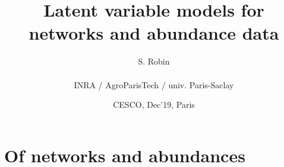 \documentclass[8pt]{beamer}
\begin{document}

\title{Latent variable models for networks and abundance data}

\author[S. Robin]{S. Robin \\ ~\\
  INRA / AgroParisTech / univ. Paris-Saclay}

\date{CESCO, Dec'19, Paris}

\maketitle


\section{Of networks and abundances}
\end{document}
